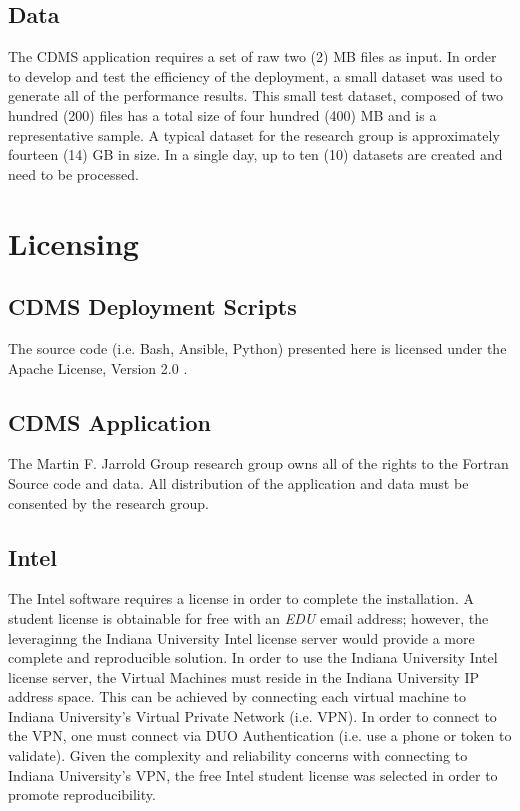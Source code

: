 \documentclass[9pt,twocolumn,twoside]{../../styles/osajnl}
\begin{document}
\subsection{Data} \label{data}
The CDMS application requires a set of raw two (2) MB files as
input. In order to develop and test the efficiency of the deployment,
a small dataset was used to generate all of the performance
results. This small test dataset, composed of two hundred (200) files
has a total size of four hundred (400) MB and is a representative
sample. A typical dataset for the research group is approximately
fourteen (14) GB in size. In a single day, up to ten (10) datasets are
created and need to be processed.

\section{Licensing} \label{licensing}
\subsection{CDMS Deployment Scripts} \label{source-license}
The source code (i.e. Bash, Ansible, Python) presented here is
licensed under the Apache License, Version 2.0 \cite{www-apache-lic}.

\subsection{CDMS Application} \label{cdms-license}
The Martin F. Jarrold Group research group owns all of the rights to
the Fortran Source code and data. All distribution of the application
and data must be consented by the research group.

\subsection{Intel} \label{intel-license}
The Intel software requires a license in order to complete the
installation. A student license is obtainable for free with an
\emph{EDU} email address; however, the leveraginng the Indiana
University Intel license server would provide a more complete and
reproducible solution. In order to use the Indiana University Intel
license server, the Virtual Machines must reside in the Indiana
University IP address space. This can be achieved by connecting each
virtual machine to Indiana University's Virtual Private Network
(i.e. VPN). In order to connect to the VPN, one must connect via DUO
Authentication (i.e. use a phone or token to validate). Given the
complexity and reliability concerns with connecting to Indiana
University's VPN, the free Intel student license was selected in order
to promote reproducibility.
\end{document}
